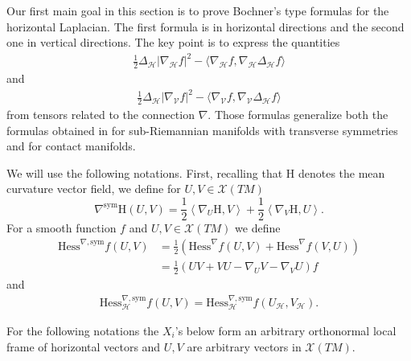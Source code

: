 \documentclass[11pt]{article}
\numberwithin{equation}{section}
\newcommand{\Ho}{\mathcal H}
\newcommand{\V}{\mathcal V}
\begin{document}
    Our first main goal in this section is to prove Bochner's type formulas for the horizontal Laplacian. The first formula is in horizontal directions and the second one in vertical directions. The key point is to express the quantities 
    \begin{align*}
			\frac{1}{2}\Delta_{\mathcal{H}} | \nabla_\Ho f|^2-\langle \nabla_{\mathcal{H}} f , \nabla_{\mathcal{H}}\Delta_{\mathcal{H}} f \rangle
		\end{align*}
		and
		\begin{align*}
			\frac{1}{2}\Delta_{\mathcal{H}} | \nabla_\V f|^2-\langle \nabla_{\mathcal{V}} f , \nabla_{\mathcal{V}}\Delta_{\mathcal{H}} f \rangle
		\end{align*}
        from tensors related to the connection $\nabla$. Those formulas generalize both the formulas obtained in \cite{BG17} for sub-Riemannian manifolds with transverse symmetries and \cite{BW14} for contact manifolds.
        
        We will use the following notations. First, recalling that $\mathrm H$ denotes the mean curvature vector field, we define for $U, V \in \mathcal{X}(TM)$
        \[
        \nabla^{\mathrm{sym}} \mathrm H(U,V)=\frac{1}{2} \left\langle \nabla_U \mathrm H,V \right\rangle+\frac{1}{2} \left\langle \nabla_V \mathrm H,U \right\rangle.
        \]
        For a smooth function $f$ and $U, V \in \mathcal{X}(TM)$ we define
        \begin{align*}
        \mathrm{Hess}^{\nabla, \mathrm{sym}} f(U,V)&=\frac{1}{2} (\mathrm{Hess}^{\nabla } f(U,V)+\mathrm{Hess}^{\nabla } f(V,U)) \\
         &=\frac{1}{2} \left(UV+VU -\nabla_U V-\nabla_VU \right)f
        \end{align*}
        and
        \begin{align*}
        \mathrm{Hess}_\Ho^{\nabla, \mathrm{sym}} f(U,V)=\mathrm{Hess}_\Ho^{\nabla, \mathrm{sym}} f(U_\Ho,V_\Ho).
        \end{align*}

        
        For the following notations the $X_i$'s below form an arbitrary orthonormal local frame of horizontal vectors and $U, V$ are arbitrary vectors  in $\mathcal{X}(TM)$.
	
\end{document}

